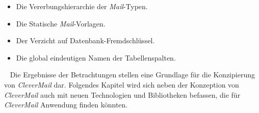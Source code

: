 \begin{itemize}
	\item Die Vererbungshierarchie der \emph{Mail}-Typen.
	\item Die Statische \emph{Mail}-Vorlagen.
	\item Der Verzicht auf Datenbank-Fremdschlüssel.
	\item Die global eindeutigen Namen der Tabellenspalten.
\end{itemize}
\ \newline
Die Ergebnisse der Betrachtungen stellen eine Grundlage für die Konzipierung von \emph{CleverMail} dar. Folgendes Kapitel wird sich neben der Konzeption von \emph{CleverMail} auch mit neuen Technologien und Bibliotheken befassen, die für \emph{CleverMail} Anwendung finden könnten. 